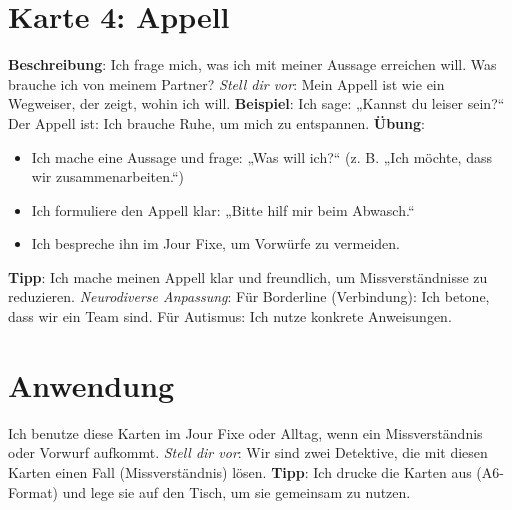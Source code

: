 \documentclass[a4paper,10pt]{article}
\begin{document}
\section*{Karte 4: Appell}
\begin{tcolorbox}[colback=calmgrey, colframe=calmblue, title={\textbf{Appell: Was will ich erreichen?}}]
\textbf{Beschreibung}: Ich frage mich, was ich mit meiner Aussage erreichen will. Was brauche ich von meinem Partner? \newline
\textit{Stell dir vor}: Mein Appell ist wie ein Wegweiser, der zeigt, wohin ich will. \newline
\textbf{Beispiel}: Ich sage: „Kannst du leiser sein?“ Der Appell ist: Ich brauche Ruhe, um mich zu entspannen. \newline
\textbf{Übung}: 
\begin{itemize}[leftmargin=*]
    \item Ich mache eine Aussage und frage: „Was will ich?“ (z. B. „Ich möchte, dass wir zusammenarbeiten.“)
    \item Ich formuliere den Appell klar: „Bitte hilf mir beim Abwasch.“
    \item Ich bespreche ihn im Jour Fixe, um Vorwürfe zu vermeiden.
\end{itemize}
\textbf{Tipp}: Ich mache meinen Appell klar und freundlich, um Missverständnisse zu reduzieren. \newline
\textit{Neurodiverse Anpassung}: Für Borderline (Verbindung): Ich betone, dass wir ein Team sind. Für Autismus: Ich nutze konkrete Anweisungen.
\end{tcolorbox}

\section*{Anwendung}
Ich benutze diese Karten im Jour Fixe oder Alltag, wenn ein Missverständnis oder Vorwurf aufkommt. \newline
\textit{Stell dir vor}: Wir sind zwei Detektive, die mit diesen Karten einen Fall (Missverständnis) lösen. \newline
\textbf{Tipp}: Ich drucke die Karten aus (A6-Format) und lege sie auf den Tisch, um sie gemeinsam zu nutzen.
\end{document}
